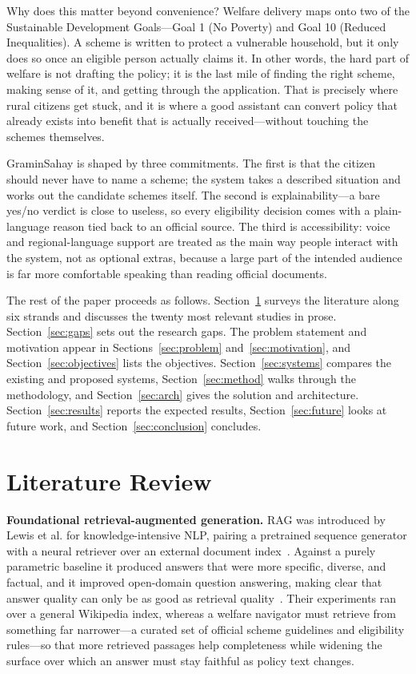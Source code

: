 \documentclass[conference]{IEEEtran}
\begin{document}
Why does this matter beyond convenience? Welfare delivery maps onto two of the Sustainable Development Goals---Goal 1 (No Poverty) and Goal 10 (Reduced Inequalities). A scheme is written to protect a vulnerable household, but it only does so once an eligible person actually claims it. In other words, the hard part of welfare is not drafting the policy; it is the last mile of finding the right scheme, making sense of it, and getting through the application. That is precisely where rural citizens get stuck, and it is where a good assistant can convert policy that already exists into benefit that is actually received---without touching the schemes themselves.

GraminSahay is shaped by three commitments. The first is that the citizen should never have to name a scheme; the system takes a described situation and works out the candidate schemes itself. The second is explainability---a bare yes/no verdict is close to useless, so every eligibility decision comes with a plain-language reason tied back to an official source. The third is accessibility: voice and regional-language support are treated as the main way people interact with the system, not as optional extras, because a large part of the intended audience is far more comfortable speaking than reading official documents.

The rest of the paper proceeds as follows. Section~\ref{sec:lit} surveys the literature along six strands and discusses the twenty most relevant studies in prose. Section~\ref{sec:gaps} sets out the research gaps. The problem statement and motivation appear in Sections~\ref{sec:problem} and~\ref{sec:motivation}, and Section~\ref{sec:objectives} lists the objectives. Section~\ref{sec:systems} compares the existing and proposed systems, Section~\ref{sec:method} walks through the methodology, and Section~\ref{sec:arch} gives the solution and architecture. Section~\ref{sec:results} reports the expected results, Section~\ref{sec:future} looks at future work, and Section~\ref{sec:conclusion} concludes.

\section{Literature Review}
\label{sec:lit}
\textbf{Foundational retrieval-augmented generation.} RAG was introduced by Lewis et al. for knowledge-intensive NLP, pairing a pretrained sequence generator with a neural retriever over an external document index~\cite{lewis2020rag}. Against a purely parametric baseline it produced answers that were more specific, diverse, and factual, and it improved open-domain question answering, making clear that answer quality can only be as good as retrieval quality~\cite{lewis2020rag}. Their experiments ran over a general Wikipedia index, whereas a welfare navigator must retrieve from something far narrower---a curated set of official scheme guidelines and eligibility rules---so that more retrieved passages help completeness while widening the surface over which an answer must stay faithful as policy text changes.
\end{document}
